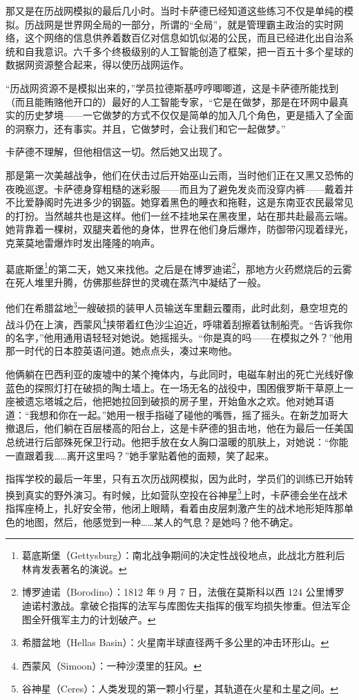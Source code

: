 \documentclass[AutoFakeBold=true]{book}
\begin{document}
那又是在历战网模拟的最后几小时。当时卡萨德已经知道这些练习不仅是单纯的模拟。历战网是世界网全局的一部分，所谓的``全局''，就是管理霸主政治的实时网络，这个网络的信息供养着数百亿对信息如饥似渴的公民，而且已经进化出自治系统和自我意识。六千多个终极级别的人工智能创造了框架，把一百五十多个星球的数据网资源整合起来，得以使历战网运作。

``历战网资源不是模拟出来的，''学员拉德斯基哼哼唧唧道，这是卡萨德所能找到（而且能贿赂他开口的）最好的人工智能专家，``它是在做梦，那是在环网中最真实的历史梦境——一它做梦的方式不仅仅是简单的加入几个角色，更是插入了全面的洞察力，还有事实。并且，它做梦时，会让我们和它一起做梦。''

卡萨德不理解，但他相信这一切。然后她又出现了。

那是第一次美越战争，他们在伏击过后开始巫山云雨，当时他们正在又黑又恐怖的夜晚巡逻。卡萨德身穿粗糙的迷彩服——而且为了避免发炎而没穿内裤——戴着并不比爱静阁时先进多少的钢盔。她穿着黑色的睡衣和拖鞋，这是东南亚农民最常见的打扮。当然越共也是这样。他们一丝不挂地呆在黑夜里，站在那共赴最高云端。她背靠着一棵树，双腿夹着他的身体，世界在他们身后爆炸，防御带闪现着绿光，克莱莫地雷爆炸时发出隆隆的响声。

葛底斯堡\footnote{葛底斯堡（Gettysburg）：南北战争期间的决定性战役地点，此战北方胜利后林肯发表著名的演说。}的第二天，她又来找他。之后是在博罗迪诺\footnote{博罗迪诺（Borodino）：1812 年 9 月 7 日，法俄在莫斯科以西 124 公里博罗迪诺村激战。拿破仑指挥的法军与库图佐夫指挥的俄军均损失惨重。但法军企图全歼俄军主力的计划破产。}，那地方火药燃烧后的云雾在死人堆里升腾，仿佛那些辞世的灵魂在蒸汽中凝结了一般。

他们在希腊盆地\footnote{希腊盆地（Hellas Basin）：火星南半球直径两千多公里的冲击环形山。}一艘破损的装甲人员输送车里翻云覆雨，此时此刻，悬空坦克的战斗仍在上演，西蒙风\footnote{西蒙风（Simoon）：一种沙漠里的狂风。}挟带着红色沙尘迫近，呼啸着刮擦着钛制船壳。``告诉我你的名字，''他用通用语轻轻对她说。她摇摇头。``你是真的吗——在模拟之外？''他用那一时代的日本腔英语问道。她点点头，凑过来吻他。

他俩躺在巴西利亚的废墟中的某个掩体内，与此同时，电磁车射出的死亡光线好像蓝色的探照灯打在破损的陶土墙上。在一场无名的战役中，围困俄罗斯干草原上一座被遗忘塔城之后，他把她拉回到破损的房子里，开始鱼水之欢。他对她耳语道：``我想和你在一起。''她用一根手指碰了碰他的嘴唇，摇了摇头。在新芝加哥大撤退后，他们躺在百层楼高的阳台上，这是卡萨德的狙击地，他在为最后一任美国总统进行后部殊死保卫行动。他把手放在女人胸口温暖的肌肤上，对她说：``你能一直跟着我……离开这里吗？''她手掌贴着他的面颊，笑了起来。

指挥学校的最后一年里，只有五次历战网模拟，因为此时，学员们的训练已开始转换到真实的野外演习。有时候，比如营队空投在谷神星\footnote{谷神星（Ceres）：人类发现的第一颗小行星，其轨道在火星和土星之间。}上时，卡萨德会坐在战术指挥座椅上，扎好安全带，他闭上眼睛，看着由皮层刺激产生的战术地形矩阵那单色的地图，然后，他感觉到一种……某人的气息？是她吗？他不确定。
\end{document}
